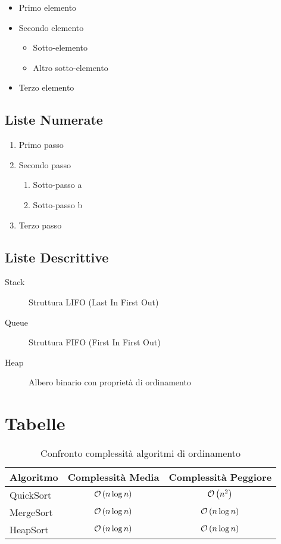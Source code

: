 \documentclass{csnotes}
\begin{document}
\begin{itemize}
    \item Primo elemento
    \item Secondo elemento
    \begin{itemize}
        \item Sotto-elemento
        \item Altro sotto-elemento
    \end{itemize}
    \item Terzo elemento
\end{itemize}

\subsection{Liste Numerate}

\begin{enumerate}
    \item Primo passo
    \item Secondo passo
    \begin{enumerate}
        \item Sotto-passo a
        \item Sotto-passo b
    \end{enumerate}
    \item Terzo passo
\end{enumerate}

\subsection{Liste Descrittive}

\begin{description}
    \item[Stack] Struttura LIFO (Last In First Out)
    \item[Queue] Struttura FIFO (First In First Out)
    \item[Heap] Albero binario con proprietà di ordinamento
\end{description}


\section{Tabelle}

\begin{table}[h]
\centering
\begin{tabular}{|l|c|c|}
\hline
\textbf{Algoritmo} & \textbf{Complessità Media} & \textbf{Complessità Peggiore} \\
\hline
QuickSort & \(\mathcal{O}\left(n \log n\right)\) & \(\mathcal{O}\left(n^2\right)\) \\
MergeSort & \(\mathcal{O}\left(n \log n\right)\) & \(\mathcal{O}\left(n \log n\right)\) \\
HeapSort & \(\mathcal{O}\left(n \log n\right)\) & \(\mathcal{O}\left(n \log n\right)\) \\
\hline
\end{tabular}
\caption{Confronto complessità algoritmi di ordinamento}
\label{tab:sorting}
\end{table}
\end{document}
